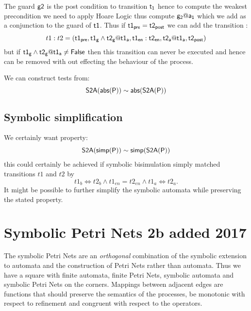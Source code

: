 \documentclass[]{article}
\begin{document}
The guard ${\sf g2}$ is the post condition to transition ${\sf t_1}$ hence to compute the weakest precondition we need to apply Hoare Logic thus compute ${\sf g_2@a_1}$  which we add as a conjunction to the guard of ${\sf t1}$.  Thus  if ${\sf t1_{pre} = t2_{post}}$   we can add the transition :
\[t1: t2 = \sf (t1_{pre}, t1_g\land t2_g@t1_a , t1_{en}:t2_{en}, t2_a@t1_a, t2_{post})\]
but if  ${\sf t1_g\land t2_g@t1_a\neq False}$ then this transition can never be executed and hence can be removed with out effecting the behaviour of the process.

We can construct tests from:
\[{\sf S2A(abs(P))\sim abs(S2A(P))}\]



\subsection{Symbolic simplification}
We certainly want property:
\[{\sf S2A(simp(P))\sim simp(S2A(P))}\]
this could certainly be achieved if symbolic bisimulation simply matched transitions $t1$ and $t2$ by 
\[t1_b\Leftrightarrow t2_b \land t1_{en}= t2_{en} \land t1_a\Leftrightarrow t2_a.\]
It might be possible to further simplify the symbolic automata while preserving the stated property.


\section{Symbolic Petri Nets {\color{red} 2b added 2017}}

The symbolic Petri Nets  are an \emph{orthogonal} combination of the symbolic extension to automata and the construction of Petri Nets rather than automata. Thus we have a square with finite automata, finite Petri Nets, symbolic automata and symbolic Petri Nets on the corners. Mappings between adjacent edges  are functions that should preserve the semantics of the processes, be monotonic with respect to refinement and congruent with respect to the operators. 
\end{document}
